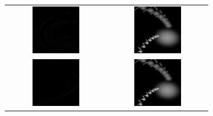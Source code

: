 \documentclass[10pt,a4paper,oneside]{article}
\theoremstyle{definition}
\begin{document}
\begin{figure}[htb]
\begin{subfigure}[b]{0.33\textwidth}
\begin{tabular}{c c }
		\includegraphics[width=0.5\textwidth]{../img/dimension/data-ikeda.png} & 
		\includegraphics[width=0.5\textwidth]{../img/dimension/model-henon.png} \\
		\includegraphics[width=0.5\textwidth]{../img/dimension/data-henon.png} & 
		\includegraphics[width=0.5\textwidth]{../img/dimension/model-henon.png} \\

\end{tabular}
\end{subfigure}
\end{figure}
\end{document}

